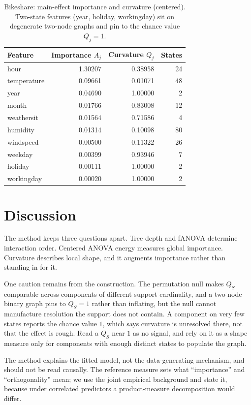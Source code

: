 \documentclass[11pt]{article}
\begin{document}
\begin{table}[ht]
\centering
\caption{Bikeshare: main-effect importance and curvature (centered). Two-state
features (year, holiday, workingday) sit on degenerate two-node graphs and pin to
the chance value $Q_j=1$.}
\label{tab:bike-main}
\begin{tabular}{lrrr}
\toprule
Feature & Importance $A_j$ & Curvature $Q_j$ & States\\
\midrule
hour        & 1.30207 & 0.38958 & 24\\
temperature & 0.09661 & 0.01071 & 48\\
year        & 0.04690 & 1.00000 & 2\\
month       & 0.01766 & 0.83008 & 12\\
weathersit  & 0.01564 & 0.71586 & 4\\
humidity    & 0.01314 & 0.10098 & 80\\
windspeed   & 0.00500 & 0.11322 & 26\\
weekday     & 0.00399 & 0.93946 & 7\\
holiday     & 0.00111 & 1.00000 & 2\\
workingday  & 0.00020 & 1.00000 & 2\\
\bottomrule
\end{tabular}
\end{table}

\section{Discussion}
\label{sec:disc}

The method keeps three questions apart. Tree depth and fANOVA determine
interaction order. Centered ANOVA energy measures global importance. Curvature
describes local shape, and it augments importance rather than standing in for it.

One caution remains from the construction. The permutation null makes $Q_S$
comparable across components of different support cardinality, and a two-node
binary graph pins to $Q_S=1$ rather than inflating, but the null cannot
manufacture resolution the support does not contain. A component on very few
states reports the chance value $1$, which says curvature is unresolved there, not
that the effect is rough. Read a $Q_S$ near $1$ as no signal, and rely on it as a
shape measure only for components with enough distinct states to populate the
graph.

The method explains the fitted model, not the data-generating mechanism, and
should not be read causally. The reference measure sets what ``importance'' and
``orthogonality'' mean; we use the joint empirical background and state it,
because under correlated predictors a product-measure decomposition would differ.
\end{document}
